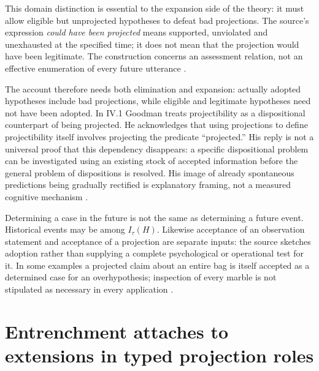 This domain distinction is essential to the expansion side of the theory:
it must allow eligible but unprojected hypotheses to defeat bad projections.
The source's expression \emph{could have been projected} means supported,
unviolated and unexhausted at the specified time; it does not mean that the
projection would have been legitimate. The construction concerns an
assessment relation, not an effective enumeration of every future utterance
\parencite[IV.2, pp.~87--92; IV.4, p.~100 and nn.~9--10]{Goodman1983FourthProjection}.

The account therefore needs both elimination and expansion: actually
adopted hypotheses include bad projections, while eligible and legitimate
hypotheses need not have been adopted. In IV.1 Goodman treats projectibility
as a dispositional counterpart of being projected. He acknowledges that
using projections to define projectibility itself involves projecting
the predicate ``projected.'' His reply is not a universal proof that this
dependency disappears: a specific dispositional problem can be investigated
using an existing stock of accepted information before the general problem
of dispositions is resolved. His image of already spontaneous predictions
being gradually rectified is explanatory framing, not a measured cognitive
mechanism \parencite[pp.~86--87, 92]{Goodman1983FourthProjection}.

Determining a case in the future is not the same as determining a future
event. Historical events may be among $I_\tau(H)$. Likewise acceptance of
an observation statement and acceptance of a projection are separate
inputs: the source sketches adoption rather than supplying a complete
psychological or operational test for it. In some examples a projected
claim about an entire bag is itself accepted as a determined case for an
overhypothesis; inspection of every marble is not stipulated as necessary
in every application \parencite[p.~91; p.~109 n.~19]{Goodman1983FourthProjection}.

\section{Entrenchment attaches to extensions in typed projection roles}
\label{sec:p15-goodman-earned-inherited}

